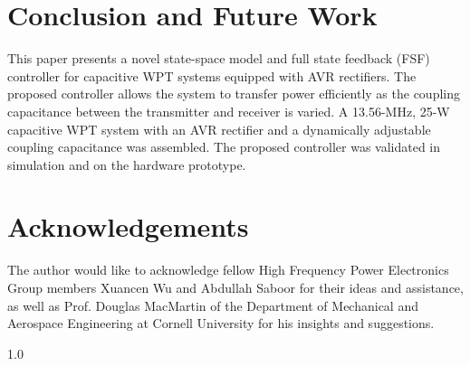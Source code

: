 \documentclass[conference, twocolumn, letterpaper]{IEEEtran}
\begin{document}
\section{Conclusion and Future Work}
\label{sec:conclusion}

This paper presents a novel state-space model and full state feedback (FSF) controller for capacitive WPT systems equipped with AVR rectifiers. The proposed controller allows the system to transfer power efficiently as the coupling capacitance between the transmitter and receiver is varied. A 13.56-MHz, 25-W capacitive WPT system with an AVR rectifier and a dynamically adjustable coupling capacitance was assembled. The proposed controller was validated in simulation and on the hardware prototype.

\section{Acknowledgements}
\label{sec:ack}

The author would like to acknowledge fellow High Frequency Power Electronics Group members Xuancen Wu and Abdullah Saboor for their ideas and assistance, as well as Prof. Douglas MacMartin of the Department of Mechanical and Aerospace Engineering at Cornell University for his insights and suggestions.

\footnotesize
\begin{spacing}{1.0}


\end{spacing}
\end{document}
